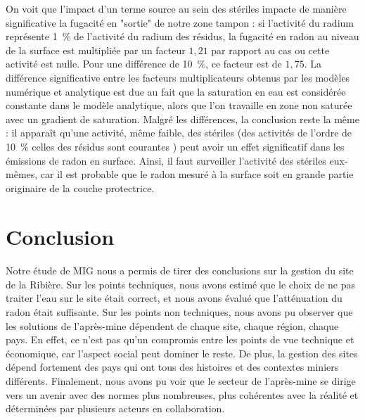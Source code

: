 \documentclass{article}
\begin{document}
On voit que l'impact d'un terme source au sein des stériles impacte de manière significative la fugacité en "sortie" de notre zone tampon : si l'activité du radium représente 1~\% de l'activité du radium des résidus, la fugacité en radon au niveau de la surface est multipliée par un facteur $1,21$ par rapport au cas ou cette activité est nulle. Pour une différence de 10~\%, ce facteur est de $1,75$. La différence significative entre les facteurs multiplicateurs obtenus par les modèles numérique et analytique est due au fait que la saturation en eau est considérée constante dans le modèle analytique, alors que l'on travaille en zone non saturée avec un gradient de saturation. Malgré les différences, la conclusion reste la même : il apparaît qu'une activité, même faible, des stériles (des activités de l'ordre de 10~\% celles des résidus sont courantes \cite{ferry_evaluation_2002}) peut avoir un effet significatif dans les émissions de radon en surface. Ainsi, il faut surveiller l'activité des stériles eux-mêmes, car il est probable que le radon mesuré à la surface soit en grande partie originaire de la couche protectrice.

\newpage
\section*{Conclusion}

\paragraph{} Notre étude de MIG nous a permis de tirer des conclusions sur la gestion du site de la Ribière. Sur les points techniques, nous avons estimé que le choix de ne pas traiter l'eau sur le site était correct, et nous avons évalué que l'atténuation du radon était suffisante. Sur les points non techniques, nous avons pu observer que les solutions de l'après-mine dépendent de chaque site, chaque région, chaque pays. En effet, ce n'est pas qu'un compromis entre les points de vue technique et économique, car l'aspect social peut dominer le reste. De plus, la gestion des sites dépend fortement des pays qui ont tous des histoires et des contextes miniers différents. Finalement, nous avons pu voir que le secteur de l'après-mine se dirige vers un avenir avec des normes plus nombreuses, plus cohérentes avec la réalité et déterminées par plusieurs acteurs en collaboration.

\end{document}
